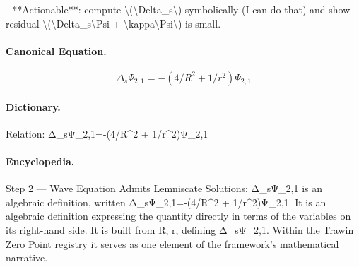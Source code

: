 - **Actionable**: compute \textbackslash{}(\textbackslash{}Delta\_s\textbackslash{}) symbolically (I can do that) and show residual \textbackslash{}(\textbackslash{}Delta\_s\textbackslash{}Psi + \textbackslash{}kappa\textbackslash{}Psi\textbackslash{}) is small.

\paragraph{Canonical Equation.}
\[
\Delta_s\Psi_{2,1}=-(4/R^2 + 1/r^2)\Psi_{2,1}
\]

\paragraph{Dictionary.}
Relation: Δ\_sΨ\_2,1=-(4/R\textasciicircum{}2 + 1/r\textasciicircum{}2)Ψ\_2,1

\paragraph{Encyclopedia.}
Step 2 — Wave Equation Admits Lemniscate Solutions: Δ\_sΨ\_2,1 is an algebraic definition, written Δ\_sΨ\_2,1=-(4/R\textasciicircum{}2 + 1/r\textasciicircum{}2)Ψ\_2,1. It is an algebraic definition expressing the quantity directly in terms of the variables on its right-hand side. It is built from R, r, defining Δ\_sΨ\_2,1. Within the Trawin Zero Point registry it serves as one element of the framework's mathematical narrative.
